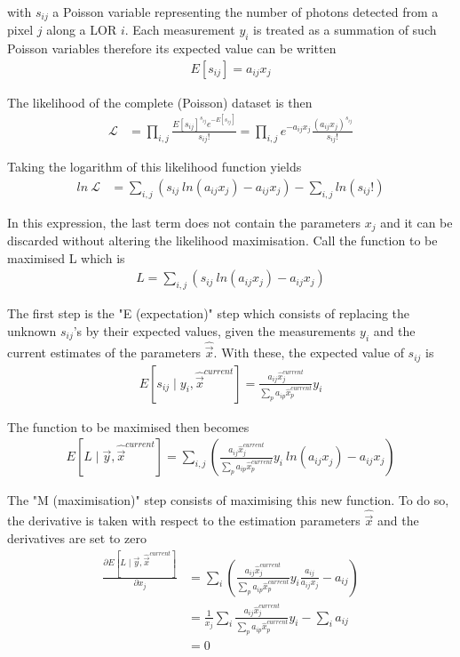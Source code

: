 \documentclass[report,12pt]{report}
\begin{document}
with $s_{ij}$ a Poisson variable representing the number of photons detected from a pixel $j$ along a LOR $i$. Each measurement $y_i$ is treated as a summation of such Poisson variables therefore its expected value can be written
\begin{align}
	E[s_{ij}] = a_{ij}x_{j}
\end{align}

The likelihood of the complete (Poisson) dataset is then
\begin{align}
	\mathcal{L} &= \prod_{i,j} \frac{E[s_{ij}]^{s_{ij}} e^{-E[s_{ij}]}}{s_{ij}!} 
	= 
	\prod_{i,j} e^{-a_{ij}x_{j}}\frac{(a_{ij}x_{j})^{s_{ij}}}{s_{ij}!}
\end{align}

Taking the logarithm of this likelihood function yields
\begin{align}
	ln\ \mathcal{L} &= \sum_{i,j} (s_{ij}\ ln(a_{ij}x_j) - a_{ij}x_j) - \sum_{i,j} 
	ln(s_{ij}!)
\end{align}	
	
In this expression, the last term does not contain the parameters $x_j$ and it can be discarded without altering the likelihood maximisation. Call the function to be maximised L which is
\begin{align}
	L = \sum_{i,j} \left( s_{ij}\ ln(a_{ij}x_j) - a_{ij}x_j \right)
\end{align}
	
The first step is the "E (expectation)" step which consists of replacing the unknown $s_{ij}$'s by their expected values, given the measurements $y_i$ and the current estimates of the parameters $\hat{\vec{x}}$. With these, the expected value of $s_{ij}$ is
\begin{align} 
	E[s_{ij} \mid y_i, \hat{\vec{x}}^{current}] = \frac{a_{ij}\hat x_{j}^{current}}{\sum_p a_{ip}\hat x_{p}^{current}}y_i
\end{align}

The function to be maximised then becomes
\begin{align}
	E[L \mid \vec y, \hat{\vec{x}}^{current}] = \sum_{i,j} \left( 
	\frac{a_{ij}\hat x_{j}^{current}}{\sum_p a_{ip}\hat x_{p}^{current}}y_i\ ln(a_{ij}x_{j}^{}) - a_{ij} x_j
	\right)
\end{align}

The "M (maximisation)" step consists of maximising this new function. To do so, the derivative is taken with respect to the estimation parameters $\hat{\vec{x}}$ and the derivatives are set to zero
\begin{align}
	\frac{\partial E[L \mid \vec y,\hat{\vec{x}}^{current}]}{\partial x_j} 
	&= 
	\sum_{i} \left(
	\frac{a_{ij} \hat x_{j}^{current}}{\sum_{p} a_{ip}\hat x_{p}^{current}} y_{i} 
	\frac{a_{ij}}{a_{ij}x_{j}} - a_{ij}
	\right)
	\nonumber
	\\
	&= \frac{1}{x_j} 
	\sum_{i} \frac{a_{ij} \hat x_{j}^{current}}{\sum_{p} a_{ip}\hat x_{p}^{current}} y_{i}
	- \sum_{i}a_{ij}
	\nonumber
	\\
	&= 0
\end{align}
\end{document}
